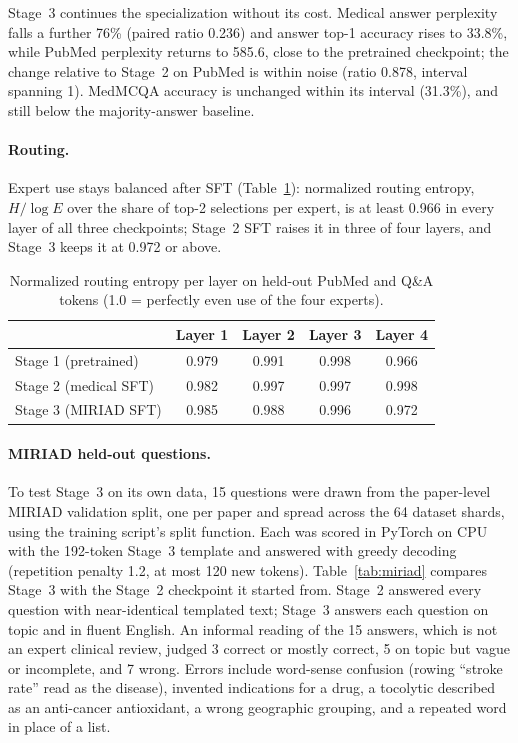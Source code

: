 \documentclass[11pt,a4paper]{article}
\begin{document}
Stage~3 continues the specialization without its cost. Medical answer perplexity falls a further 76\% (paired ratio 0.236) and answer top-1 accuracy rises to 33.8\%, while PubMed perplexity returns to 585.6, close to the pretrained checkpoint; the change relative to Stage~2 on PubMed is within noise (ratio 0.878, interval spanning 1). MedMCQA accuracy is unchanged within its interval (31.3\%), and still below the majority-answer baseline.

\paragraph{Routing.} Expert use stays balanced after SFT (Table~\ref{tab:routing}): normalized routing entropy, $H/\log E$ over the share of top-2 selections per expert, is at least 0.966 in every layer of all three checkpoints; Stage~2 SFT raises it in three of four layers, and Stage~3 keeps it at 0.972 or above.

\begin{table}[t]
\centering
\caption{Normalized routing entropy per layer on held-out PubMed and Q\&A tokens (1.0 = perfectly even use of the four experts).}
\label{tab:routing}
\small
\begin{tabular}{@{}lcccc@{}}
\toprule
 & Layer 1 & Layer 2 & Layer 3 & Layer 4 \\
\midrule
Stage 1 (pretrained) & 0.979 & 0.991 & 0.998 & 0.966 \\
Stage 2 (medical SFT) & 0.982 & 0.997 & 0.997 & 0.998 \\
Stage 3 (MIRIAD SFT) & 0.985 & 0.988 & 0.996 & 0.972 \\
\bottomrule
\end{tabular}
\end{table}

\paragraph{MIRIAD held-out questions.} To test Stage~3 on its own data, 15 questions were drawn from the paper-level MIRIAD validation split, one per paper and spread across the 64 dataset shards, using the training script's split function. Each was scored in PyTorch on CPU with the 192-token Stage~3 template and answered with greedy decoding (repetition penalty 1.2, at most 120 new tokens). Table~\ref{tab:miriad} compares Stage~3 with the Stage~2 checkpoint it started from. Stage~2 answered every question with near-identical templated text; Stage~3 answers each question on topic and in fluent English. An informal reading of the 15 answers, which is not an expert clinical review, judged 3 correct or mostly correct, 5 on topic but vague or incomplete, and 7 wrong. Errors include word-sense confusion (rowing ``stroke rate'' read as the disease), invented indications for a drug, a tocolytic described as an anti-cancer antioxidant, a wrong geographic grouping, and a repeated word in place of a list.
\end{document}
